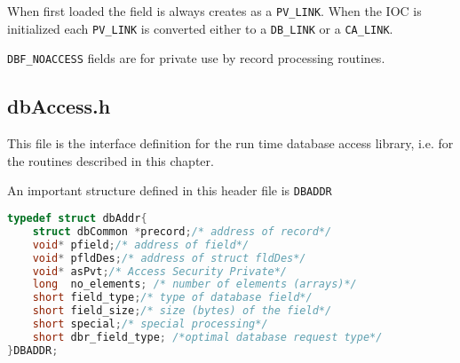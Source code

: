 When first loaded the field is always creates as a \verb|PV_LINK|.
When the IOC is initialized each \verb|PV_LINK| is converted either to a \verb|DB_LINK| or a \verb|CA_LINK|.

\verb|DBF_NOACCESS| fields are for private use by record processing routines.

\subsection{dbAccess.h}

This file is the interface definition for the run time database access library, i.e. for the routines described in this chapter.

An important structure defined in this header file is \verb|DBADDR|

\begin{lstlisting}[language=C]
typedef struct dbAddr{
    struct dbCommon *precord;/* address of record*/
    void* pfield;/* address of field*/
    void* pfldDes;/* address of struct fldDes*/
    void* asPvt;/* Access Security Private*/
    long  no_elements; /* number of elements (arrays)*/
    short field_type;/* type of database field*/
    short field_size;/* size (bytes) of the field*/
    short special;/* special processing*/
    short dbr_field_type; /*optimal database request type*/
}DBADDR;
\end{lstlisting}

